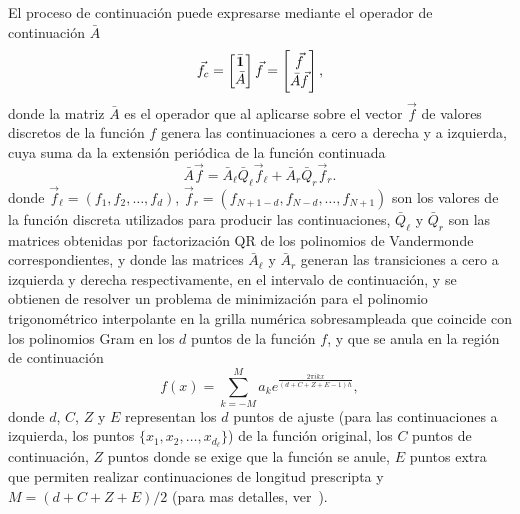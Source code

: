 El proceso de continuación puede expresarse mediante el operador de continuación $\bar{A}$
\begin{equation}
\vec{f}_c= 
\begin{bmatrix}
    \bar{\mathbf{1}} \\
    \bar{A}  \\
\end{bmatrix}
\vec{f}=
\begin{bmatrix}
    \vec{f}\\
    \bar{A} \vec{f}  \\
\end{bmatrix}
,
\label{eq:FCopA}
\end{equation}
donde la matriz $\bar{A}$ es el operador que al aplicarse sobre 
el vector $\vec{f}$ de valores discretos de la función $f$ 
genera las continuaciones a cero a derecha y a izquierda, cuya suma 
da la extensión periódica de la función continuada
\begin{equation}
    \bar{A}  \vec{f} = \bar{A}_{\ell} \bar{Q}_{\ell}  \vec{f}_{\ell} 
+\bar{A}_{r} \bar{Q}_{r}  \vec{f}_{r}.
\label{eq:Acont}
\end{equation}
donde $\vec{f}_{\ell}=(f_1,f_2,\ldots,f_d)$, 
 $\vec{f}_{r}=(f_{N+1-d},f_{N-d},\ldots,f_{N+1})$ 
 son los valores de la función discreta utilizados para producir las continuaciones, $\bar{Q}_{\ell} $ y $\bar{Q}_{r}$ son las matrices obtenidas por factorización 
QR de los polinomios de Vandermonde correspondientes, y donde las matrices $\bar{A}_{\ell}$ 
y $\bar{A}_{r}$ generan las transiciones a cero a izquierda y derecha respectivamente, en el intervalo de continuación, 
y se obtienen de resolver un problema de minimización 
para el polinomio trigonométrico interpolante en la grilla numérica sobresampleada 
que coincide con los polinomios Gram en los $d$ puntos de la función $f$, y 
que se anula en la región de continuación
\begin{equation}
f(x)=\sum_{k=-M}^{M} a_k e^{\frac{2\pi i k x}{(d+C+Z+E-1)h}},
\label{eq:fccontint}
\end{equation}
donde $d$, $C$, $Z$ y $E$ representan los $d$ puntos de ajuste (para las continuaciones a izquierda, los puntos $\{x_{1},x_{2},\ldots, x_{d_{\ell}} \}$) de la función original, 
los $C$ puntos de continuación, $Z$ puntos donde se exige que la función se anule, $E$ 
puntos extra que permiten realizar continuaciones de longitud prescripta 
y $M=(d+C+Z+E)/2$ (para mas detalles, ver~\cite{Amlani2016}).


